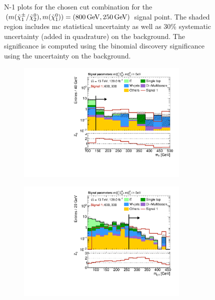 \begin{figure}
	\caption[N-1 plots for the chosen cut combination for the (800, 250) signal point]{N-1 plots for the chosen cut combination for the $(m(\charg/\neutr), m(\lsp)) = (\SI{800}{\GeV}, \SI{250}{\GeV})$ signal point. The shaded region includes \gls{mc} statistical uncertainty as well as 30\% systematic uncertainty (added in quadrature) on the background. The significance is computed using the binomial discovery significance using the uncertainty on the background.}
	\label{fig:results_n1_800_250}
\end{figure}

\begin{figure}
	\centering
	\begin{subfigure}[b]{0.5\linewidth}
		\centering\includegraphics[width=0.9\textwidth]{N-1_cut_scan/n1_600_300/mt}
	\end{subfigure}\hfill
	\begin{subfigure}[b]{0.5\linewidth}
		\centering\includegraphics[width=0.9\textwidth]{N-1_cut_scan/n1_600_300/mct}

\end{subfigure}
\end{figure}
